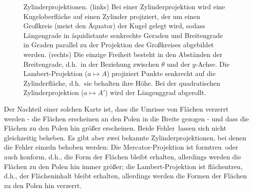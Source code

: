 \begin{figure}[htb]
\hspace{1cm}
%
\caption{\label{fig_Zylinderprojektion}%
Zylinderprojektionen. (links) Bei einer Zylinderprojektion wird eine Kugeloberfl\"ache auf einen Zylinder
projiziert, der um einen Gro\ss kreis (meist den \"Aquator) der Kugel gelegt wird, sodass L\"angengrade
in \"aquidistante senkrechte Geraden und Breitengrade in Graden parallel zu der Projektion des
Gro\ss kreises abgebildet werden. (rechts) Die einzige Freiheit besteht in den Abst\"anden der Breitengrade,
d.h.\ in der Beziehung zwischen $\theta$ und  der $y$-Achse. Die Lambert-Projektion ($a\mapsto A$)
projiziert Punkte senkrecht auf die Zylinderfl\"ache, d.h.\ sie behalten ihre H\"ohe. Bei der quadratischen
Zylinderprojektion ($a\mapsto A'$) wird der L\"angenggrad \glqq abgerollt\grqq.} 
\end{figure}


Der Nachteil einer solchen Karte ist, dass die Umrisse von Fl\"achen verzerrt werden - die Fl\"achen erscheinen
an den Polen in die Breite gezogen - und dass die Fl\"achen zu den Polen hin gr\"o\ss er erscheinen.
Beide \glqq Fehler\grqq\ lassen sich nicht gleichzeitig beheben. Es gibt aber zwei bekannte Zylinderprojektionen,
bei denen die Fehler einzeln behoben werden: Die Mercator-Projektion ist 
\glqq formtreu\grqq\ oder auch
konform, d.h., die Form der Fl\"achen bleibt erhalten, allerdings werden die Fl\"achen zu den Polen hin immer
gr\"o\ss er; die Lambert-Projektion ist \glqq fl\"achentreu\grqq, d.h., der Fl\"acheninhalt bleibt erhalten, 
allerdings werden die Formen der Fl\"achen zu den Polen hin verzerrt.

